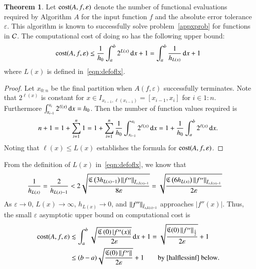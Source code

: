 \documentclass[review]{elsarticle}
\newcommand{\abstol}{\varepsilon}
\newcommand{\oton}{1\!:\!n}
\theoremstyle{definition}
\newtheorem{theorem}{Theorem}
\begin{document}
\begin{theorem}\label{thm:cost}
Let $\cost(A,f,\abstol)$ denote the number of functional evaluations required by
Algorithm $A$ for the input function $f$ and the absolute error tolerance
$\abstol$. This algorithm is known to successfully solve
problem~\eqref{appxprob} for functions in $\cc$. The computational cost of doing
so has the following upper bound:
\begin{equation*}
\cost(A,f,\abstol) \le \frac{1}{h_0}\int_a^b 2^{L(x)} \, \dif x +1 = \int_a^b \frac{1}{h_{L(x)}} \, \dif x +1 \\
\end{equation*}
where $L(x)$ is defined in~\eqref{eqn:defoflx}.
\end{theorem}

\begin{proof}
Let $x_{0:n}$ be the final partition when $A(f,\abstol)$
successfully terminates. Note that $2^{\ell(x)}$ is constant for $x \in
I_{x_{i-1},\ell(x_{i-1})} = [x_{i-1},x_{i}]$ for $i \in \oton$. Furthermore
$\int_{x_{i-1}}^{x_{i}} 2^{\ell(x)} \, \dif x = h_0$. Then the number of
function values required is
\begin{equation*}
n+1 = 1 + \sum_{i=1}^{n} 1 = 1 + \sum_{i=1}^{n} \frac{1}{h_0} 
\int_{x_{i-1}}^{x_{i}} 2^{\ell(x)} \, \dif  x = 1 + \frac{1}{h_0}\int_a^b 2^{\ell(x)} \, \dif x.
\end{equation*}
Noting that $\ell(x) \le L(x)$ establishes the formula for $\cost(A,f,\abstol)$.
\end{proof}

From the definition of $L(x)$ in~\eqref{eqn:defoflx}, we know that 
\begin{align*}
\frac{1}{h_{L(x)}} = \frac{2}{h_{L(x)-1}}  & < 2 \sqrt{\frac{\fC\left(3 h_{L(x)-1} \right)\norm[\bar{I}_{x,L(x)-1}]{f''} }{8\abstol}}  
= \sqrt{\frac{\fC\left(6 h_{L(x)} \right)\norm[\bar{I}_{x,L(x)-1}]{f''} }{2\abstol}}
\end{align*}
As $\abstol \to 0$, $L(x) \to \infty$, $h_{L(x)} \to 0$, and  $\norm[\bar{I}_{x,L(x)-1}]{f''}$ approaches $|f''(x)|$.  Thus, the small $\abstol$ asymptotic upper bound on computational cost is
\begin{align}
\cost(A,f,\abstol)  &\lesssim \int_a^b \sqrt{\frac{\fC\left(0\right)   |f''(x)|}{2\abstol}} \, \dif x +1  =\sqrt{\frac{\fC(0) \norm[\frac 12]{f''}}{2\abstol}} +1 \label{costbdapprox} \\
& \le (b-a)\sqrt{\frac{\fC(0) \norm{f''}}{2\abstol}} +1 \label{costbdinf}  \qquad \text{by \eqref{halflessinf} below}.
\end{align}
\end{document}
